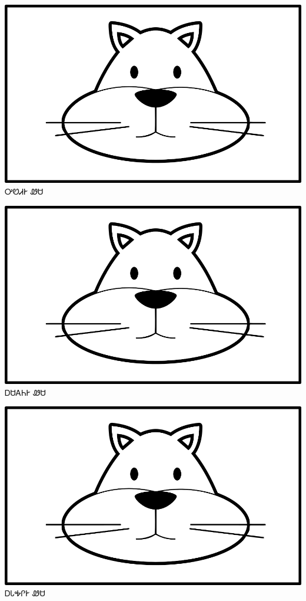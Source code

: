 \documentclass[avery5371]{flashcards}%
\begin{document}
\begin{flashcard}{
\includegraphics[width=0.95\columnwidth,height=.51\columnwidth,keepaspectratio]{../artwork/for-colors/wesa}
}\Huge ᎤᏬᏗᎨ ᏪᏌ
\end{flashcard}

\begin{flashcard}{
\includegraphics[width=0.95\columnwidth,height=.51\columnwidth,keepaspectratio]{../artwork/for-colors/wesa}
}\Huge ᎠᏌᎪᏂᎨ ᏪᏌ
\end{flashcard}

\begin{flashcard}{
\includegraphics[width=0.95\columnwidth,height=.51\columnwidth,keepaspectratio]{../artwork/for-colors/wesa}
}\Huge ᎠᏓᎭᎵᎨ ᏪᏌ
\end{flashcard}
\end{document}
